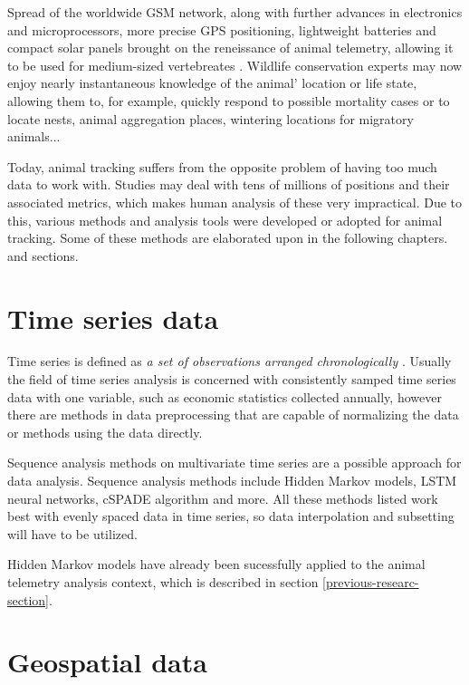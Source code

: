 Spread of the worldwide GSM network, along with further advances in electronics and microprocessors, more precise GPS positioning, lightweight batteries and compact solar panels brought on the reneissance of animal telemetry, allowing it to be used for medium-sized vertebreates \cite{kays2015terrestrial}. Wildlife conservation experts may now enjoy nearly instantaneous knowledge of the animal' location or life state, allowing them to, for example, quickly respond to possible mortality cases or to locate nests, animal aggregation places, wintering locations for migratory animals... 


Today, animal tracking suffers from the opposite problem of having too much data to work with. Studies may deal with tens of millions of positions and their associated metrics, which makes human analysis of these very impractical. Due to this, various methods and analysis tools were developed or adopted for animal tracking. Some of these methods are elaborated upon in the following chapters. and sections.

\section{Time series data}

Time series is defined as \emph{a set of observations arranged chronologically} \cite{parzen1961approach}. Usually the field of time series analysis is concerned with consistently samped time series data with one variable, such as economic statistics collected annually, however there are methods in data preprocessing that are capable of normalizing the data or methods using the data directly.

Sequence analysis methods on multivariate time series are a possible approach for data analysis. Sequence analysis methods include Hidden Markov models, LSTM neural networks, cSPADE algorithm and more. All these methods listed work best with evenly spaced data in time series, so data interpolation and subsetting will have to be utilized. %

Hidden Markov models have already been sucessfully applied to the animal telemetry analysis context, which is described in section \ref{previous-researc-section}.

\section{Geospatial data}

